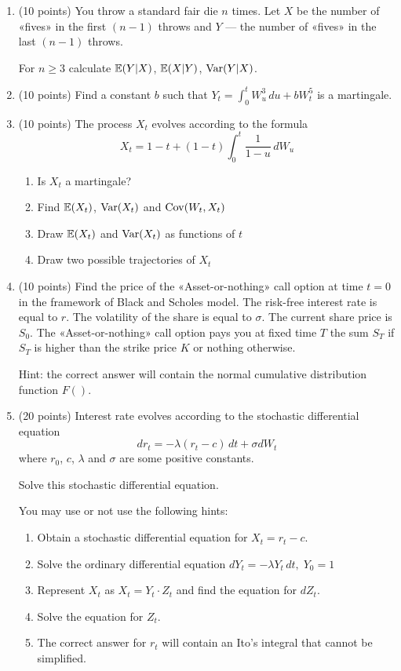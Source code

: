 \documentclass[12pt, a4paper]{article}
\begin{document}
\begin{enumerate}


\item (10 points) You throw a standard fair die $n$ times. Let $X$ be the number of «fives» in the first $(n-1)$ throws and $Y$ — the number of «fives» in the last $(n-1)$ throws.

For $n\geq 3$ calculate $\mathbb{E}(Y|X)$, $\mathbb{E}(X|Y)$, $\operatorname{Var}(Y|X)$.

\item (10 points) Find a constant $b$ such that $Y_t = \int_0^t W_u^3 \, du + b W_t^5$ is a martingale.


\item (10 points) The process $X_t$ evolves according to the formula
\[
X_t = 1 - t + (1 - t) \int_0^t \frac{1}{1-u} \, dW_u
\]

\begin{enumerate}
\item Is $X_t$ a martingale?
\item Find $\mathbb{E}(X_t)$, $\operatorname{Var}(X_t)$ and $\operatorname{Cov}(W_t, X_t)$
\item Draw $\mathbb{E}(X_t)$ and $\operatorname{Var}(X_t)$ as functions of $t$
\item Draw two possible trajectories of $X_t$
\end{enumerate}


\item (10 points) Find the price of the «Asset-or-nothing» call option at time $t=0$ in the framework of Black and Scholes model. The risk-free interest rate is equal to $r$. The volatility of the share is equal to $\sigma$. The current share price is $S_0$. The «Asset-or-nothing» call option pays you at fixed time $T$ the sum $S_T$ if $S_T$ is higher than the strike price $K$ or nothing otherwise.

Hint: the correct answer will contain the normal cumulative distribution function $F()$.

\item (20 points) Interest rate evolves according to the stochastic differential equation
\[
dr_t = -\lambda (r_t - c) \, dt + \sigma dW_t
\]
where $r_0$, $c$, $\lambda$ and $\sigma$ are some positive constants.

Solve this stochastic differential equation.

You may use or not use the following hints:

\begin{enumerate}
\item Obtain a stochastic differential equation for $X_t = r_t - c$.
\item Solve the ordinary differential equation $dY_t = -\lambda Y_t \, dt, \; Y_0 = 1$
\item Represent $X_t$ as $X_t = Y_t \cdot Z_t$ and find the equation for $dZ_t$.
\item Solve the equation for $Z_t$.
\item The correct answer for $r_t$ will contain an Ito's integral that cannot be simplified.
\end{enumerate}

\end{enumerate}
\end{document}

